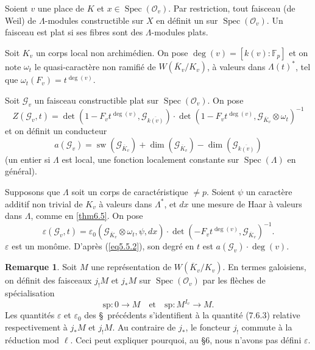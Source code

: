 \documentclass[11pt,a4paper]{amsart}
\theoremstyle{plain}
\theoremstyle{definition}
\newtheorem{remark}[theorem]{Remarque}
\DeclareMathOperator{\Spec}{Spec}
\newcommand{\dbF}{\mathbb{F}}
\DeclareMathOperator{\sw}{sw}
\def\dim{\mathop{\mathrm{dim}}\nolimits}
\newenvironment{para}{\par\noindent}{\par}
\newcommand{\scrO}{\mathscr{O}}
\newcommand{\ov}[1]{\overline{#1}}
\newcommand{\eps}{\varepsilon}
\begin{document}
\begin{para}
Soient $v$ une place de $K$ et $x \in \Spec(\scrO_{v})$. Par restriction, tout faisceau (de Weil) de $\Lambda$-modules constructible sur $X$ en d\'efinit un sur $\Spec(\scrO_{v})$. Un faisceau est plat si ses fibres sont des $\Lambda$-modules plats.
\end{para}

\begin{para}
Soit $K_{v}$ un corps local non archim\'edien. On pose $\deg(v) = [k(v):\dbF_{p}]$ et on note $\omega_{t}$ le quasi-caract\`ere non ramifi\'e de $W(\ov{K}_{v}/K_{v})$, \`a valeurs dans $\Lambda(t)^{*}$, tel que $\omega_{t}(F_{v}) = t^{\deg(v)}$.
\end{para}

\begin{para}
Soit $\mathscr{G}_{v}$ un faisceau constructible plat sur $\Spec(\scrO_{v})$. On pose
\begin{equation}
Z(\mathscr{G}_{v},t) = \det(1 - F_{v}t^{\deg(v)}, \mathscr{G}_{\ov{k(v)}}) \cdot \det(1 - F_{v}t^{\deg(v)}, \mathscr{G}_{\ov{K}_{v}} \otimes \omega_{t})^{-1}
\end{equation}
et on d\'efinit un conducteur
\begin{equation}
a(\mathscr{G}_{v}) = \sw(\mathscr{G}_{\ov{K}_{v}}) + \dim(\mathscr{G}_{\ov{K}_{v}}) - \dim(\mathscr{G}_{\ov{k(v)}})
\end{equation}
(un entier si $\Lambda$ est local, une fonction localement constante sur $\Spec(\Lambda)$ en g\'en\'eral).
\end{para}

Supposons que $\Lambda$ soit un corps de caract\'eristique $\not= p$. Soient $\psi$ un caract\`ere additif non trivial de $K_{v}$ \`a valeurs dans $\Lambda^{*}$, et $dx$ une mesure de Haar \`a valeurs dans $\Lambda$, comme en \ref{thm6.5}. On pose
\begin{equation}
\eps(\mathscr{G}_{v},t) = \eps_{0}(\mathscr{G}_{\ov{K}_{v}} \otimes \omega_{t}, \psi, dx) \cdot \det(-F_{v}t^{\deg(v)}, \mathscr{G}_{\ov{K}_{v}})^{-1}.
\end{equation}
$\eps$ est un mon\^ome. D'apr\`es (\ref{eq5.5.2}), son degr\'e en $t$ est $a(\mathscr{G}_{v}) \cdot \deg(v)$.

\begin{remark}
Soit $M$ une repr\'esentation de $W(\ov{K}_{v}/K_{v})$. En termes galoisiens, on d\'efinit des faisceaux $j_{!}M$ et $j_{*}M$ sur $\Spec(\scrO_{v})$ par les fl\`eches de sp\'ecialisation
\[
\text{sp}: 0 \longrightarrow M \quad \text{et} \quad \text{sp}: M^{I_{v}} \longrightarrow M.
\]
Les quantit\'es $\eps$ et $\eps_{0}$ des \S\ pr\'ec\'edents s'identifient \`a la quantit\'e (7.6.3) relative respectivement \`a $j_{*}M$ et $j_{!}M$. Au contraire de $j_{*}$, le foncteur $j_{!}$ commute \`a la r\'eduction mod $\ell$. Ceci peut expliquer pourquoi, au \S6, nous n'avons pas d\'efini $\eps$.
\end{remark}
\end{document}
